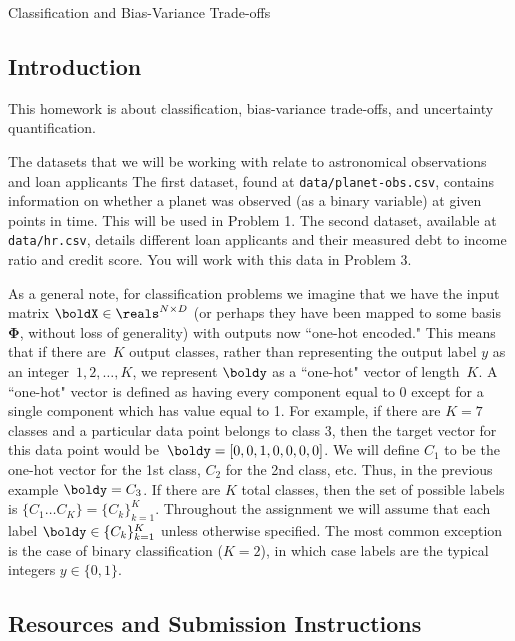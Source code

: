 \documentclass[submit]{../harvardml}
\begin{document}
\begin{center}
  {\Large Classification and Bias-Variance Trade-offs}\\
\end{center}

\subsection*{Introduction}

This homework is about classification, bias-variance trade-offs, and
uncertainty quantification.

The datasets that we will be working with relate to astronomical observations and loan applicants
The first dataset, found at \verb|data/planet-obs.csv|,
contains information on whether a planet was observed (as a binary
variable) at given points in time. This will be used in Problem 1. The
second dataset, available at \verb|data/hr.csv|, details different
loan applicants and their measured debt to income ratio and credit score. You will
work with this data in Problem 3.

As a general note, for classification problems we imagine that we have
the input matrix $\boldX \in \reals^{N \times D}$ (or perhaps they
have been mapped to some basis $\bm{\Phi}$, without loss of
generality) with outputs now ``one-hot encoded."  This means that if
there are~$K$ output classes, rather than representing the output
label $y$ as an integer~${1,2,\ldots,K}$, we represent $\boldy$ as a
``one-hot" vector of length~$K$. A ``one-hot" vector is defined as
having every component equal to 0 except for a single component which
has value equal to 1.  For example, if there are $K = 7$ classes and a
particular data point belongs to class 3, then the target vector for
this data point would be~$\boldy = [0,0,1,0,0,0,0]$.  We will define
$C_1$ to be the one-hot vector for the 1st class, $C_2$ for the 2nd
class, etc.  Thus, in the previous example $\boldy = C_3$. If there
are $K$ total classes, then the set of possible labels is $\{C_1
  \ldots C_K \} = \{C_k\}_{k=1}^K$.  Throughout the assignment we will
assume that each label $\boldy \in \{C_k\}_{k=1}^K$ unless otherwise
specified. The most common exception is the case of binary
classification ($K = 2$), in which case labels are the typical
integers $y \in \{0, 1\}$.

\subsection*{Resources and Submission Instructions}
\end{document}
